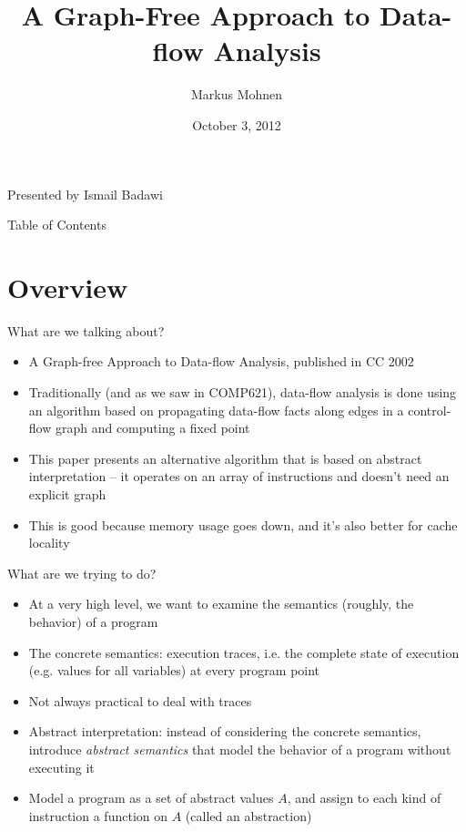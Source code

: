 \documentclass{beamer}
\title[A Graph-Free Approach to Data-flow Analysis]
{A Graph-Free Approach to Data-flow Analysis \nocite{Mohnen}}
\date{October 3, 2012}
\author[Markus Mohnen]{Markus Mohnen}
\begin{document}

\begin{frame}
\titlepage
\begin{center}
Presented by Ismail Badawi
\end{center}
\end{frame}

\begin{frame}{Table of Contents}
\tableofcontents
\end{frame}

\section{Overview}
\begin{frame}{What are we talking about?}
\begin{itemize}
\item A Graph-free Approach to Data-flow Analysis, published in CC 2002
\item Traditionally (and as we saw in COMP621), data-flow analysis is done
using an algorithm based on propagating data-flow facts along edges in
a control-flow graph and computing a fixed point
\item This paper presents an alternative algorithm that is based on
abstract interpretation -- it operates on an array of instructions and
doesn't need an explicit graph
\item This is good because memory usage goes down, and it's also better
for cache locality
\end{itemize}
\end{frame}

\begin{frame}{What are we trying to do?}
\begin{itemize}
\item At a very high level, we want to examine the semantics (roughly, 
the behavior) of a program
\item The concrete semantics: execution traces, i.e. the complete state
of execution (e.g. values for all variables) at every program point
\item Not always practical to deal with traces
\item Abstract interpretation: instead of considering the concrete
semantics, introduce \emph{abstract semantics} that model the behavior
of a program without executing it
\item Model a program as a set of abstract values $A$, and assign to each
kind of instruction a function on $A$ (called an abstraction)
\end{itemize}
\end{frame}
\end{document}
